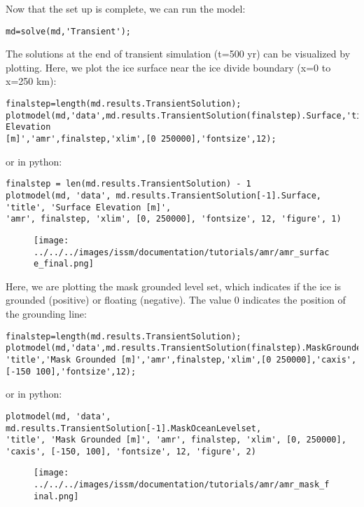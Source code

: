 Now that the set up is complete, we can run the model:
\begin{verbatim}md=solve(md,'Transient');\end{verbatim}

The solutions at the end of transient simulation (t=500 yr) can be visualized by plotting. Here, we plot the ice surface near the ice divide boundary (x=0 to x=250 km):
\begin{verbatim}finalstep=length(md.results.TransientSolution);
plotmodel(md,'data',md.results.TransientSolution(finalstep).Surface,'title','Surface Elevation
[m]','amr',finalstep,'xlim',[0 250000],'fontsize',12);\end{verbatim}
or in python:
\begin{verbatim}finalstep = len(md.results.TransientSolution) - 1
plotmodel(md, 'data', md.results.TransientSolution[-1].Surface, 'title', 'Surface Elevation [m]',
'amr', finalstep, 'xlim', [0, 250000], 'fontsize', 12, 'figure', 1)\end{verbatim}

\begin{figure}[H]
	\begin{center}
		\texttt{[image: ../../../images/issm/documentation/tutorials/amr/amr\_surface\_final.png]}
	\end{center}
\end{figure}

Here, we are plotting the mask grounded level set, which indicates if the ice is grounded (positive) or floating (negative). The value 0 indicates the position of the grounding line:
\begin{verbatim}finalstep=length(md.results.TransientSolution);
plotmodel(md,'data',md.results.TransientSolution(finalstep).MaskGroundediceLevelset,...
'title','Mask Grounded [m]','amr',finalstep,'xlim',[0 250000],'caxis',[-150 100],'fontsize',12);\end{verbatim}
or in python:
\begin{verbatim}plotmodel(md, 'data', md.results.TransientSolution[-1].MaskOceanLevelset,
'title', 'Mask Grounded [m]', 'amr', finalstep, 'xlim', [0, 250000], 'caxis', [-150, 100], 'fontsize', 12, 'figure', 2)\end{verbatim}

\begin{figure}[H]
	\begin{center}
		\texttt{[image: ../../../images/issm/documentation/tutorials/amr/amr\_mask\_final.png]}
	\end{center}
\end{figure}

